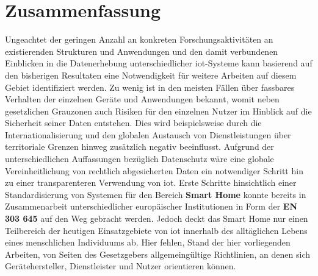 
\section{Zusammenfassung}
\label{sec:Zusammenfassung}
Ungeachtet der geringen Anzahl an konkreten Forschungsaktivitäten an existierenden Strukturen und Anwendungen und den damit verbundenen Einblicken in die Datenerhebung unterschiedlicher \ac{iot}-Systeme kann basierend auf den bisherigen Resultaten eine Notwendigkeit für weitere Arbeiten auf diesem Gebiet identifiziert werden. Zu wenig ist in den meisten Fällen über fassbares Verhalten der einzelnen Geräte und Anwendungen bekannt, womit neben gesetzlichen Grauzonen auch Risiken für den einzelnen Nutzer im Hinblick auf die Sicherheit seiner Daten entstehen. Dies wird beispielsweise durch die Internationalisierung und den globalen Austausch von Dienstleistungen über territoriale Grenzen hinweg zusätzlich negativ beeinflusst. Aufgrund der unterschiedlichen Auffassungen bezüglich Datenschutz wäre eine globale Vereinheitlichung von rechtlich abgesicherten Daten ein notwendiger Schritt hin zu einer transparenteren Verwendung von \ac{iot}. 
Erste Schritte hinsichtlich einer Standardisierung von Systemen für den Bereich \textbf{Smart Home} konnte bereits in Zusammenarbeit unterschiedlicher europäischer Institutionen in Form der \textbf{EN 303 645} \cite{ETSI2020} auf den Weg gebracht werden. Jedoch deckt das Smart Home nur einen Teilbereich der heutigen Einsatzgebiete von \ac{iot} innerhalb des alltäglichen Lebens eines menschlichen Individuums ab. Hier fehlen, Stand der hier vorliegenden Arbeiten, von Seiten des Gesetzgebers allgemeingültige Richtlinien, an denen sich Gerätehersteller, Dienstleister und Nutzer orientieren können.

